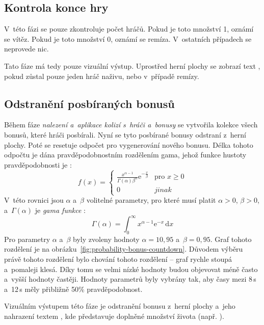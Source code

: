 \subsection*{Kontrola konce hry}

V~této fázi se pouze zkontroluje počet hráčů. Pokud je toto množství 1, oznámí se vítěz. Pokud je toto množství 0, oznámí se remíza. V~ostatních případech se neprovede nic.

Tato fáze má tedy pouze vizuální výstup. Uprostřed herní plochy se zobrazí text , pokud zůstal pouze jeden hráč naživu, nebo  v~případě remízy.

\subsection*{Odstranění posbíraných bonusů}

Během fáze \emph{nalezení a~aplikace kolizí s~hráči a~bonusy} se vytvořila kolekce všech bonusů, které hráči posbírali. Nyní se tyto posbírané bonusy odstraní z~herní plochy. Poté se resetuje odpočet pro vygenerování nového bonusu. Délka tohoto odpočtu je dána pravděpodobnostním rozdělením gama, jehož funkce hustoty pravděpodobnosti je \cite{Probability:Papoulis:2002}:
\begin{equation}
    f(x) = \left\{
    \begin{array}{ll}
        \frac{x^{\alpha-1}}{\Gamma(\alpha)\beta^\alpha}\mathrm{e}^{-\frac{x}{\beta}} & \text{pro }x \geq 0 \\
        0 & jinak
    \end{array}
    \right.
\end{equation}
V~této rovnici jsou $\alpha$ a~$\beta$ volitelné parametry, pro které musí platit $\alpha > 0$, $\beta > 0$, a~$\Gamma(\alpha)$ je \emph{gama funkce} \cite{Probability:Papoulis:2002}:
\begin{equation}
    \Gamma(\alpha) = \int_0^\infty x^{\alpha - 1}\mathrm{e}^{-x}\,\mathrm{d}x
\end{equation}
Pro parametry $\alpha$ a~$\beta$ byly zvoleny hodnoty $\alpha = 10{,}95$ a~$\beta = 0{,}95$. Graf tohoto rozdělení je na obrázku~\ref{fig:probability-bonus-countdown}. Důvodem výběru právě tohoto rozdělení bylo chování tohoto rozdělení -- graf rychle stoupá a~pomaleji klesá. Díky tomu se velmi nízké hodnoty budou objevovat méně často a~vyšší hodnoty častěji. Hodnoty parametrů byly vybrány tak, aby časy mezi 8\,s a~12\,s měly přibližně 50\% pravděpodobnost.

Vizuálním výstupem této fáze je odstranění bonusu z~herní plochy a~jeho nahrazení textem , kde  představuje doplněné množství života (např. ).

